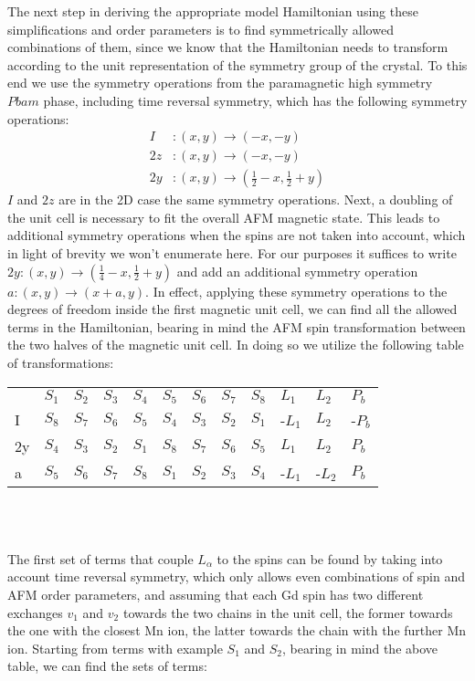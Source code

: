 The next step in deriving the appropriate model Hamiltonian using these simplifications and order parameters is to find symmetrically allowed combinations of them, since we know that the Hamiltonian needs to transform according to the unit representation of the symmetry group of the crystal.
To this end we use the symmetry operations from the paramagnetic high symmetry $Pbam$ phase, including time reversal symmetry, which has the following symmetry operations:
\begin{align}
	I &: (x, y) \rightarrow (-x, -y)\\
	2z &: (x, y) \rightarrow (-x, -y)\\
	2y &: (x, y) \rightarrow (\frac{1}{2} - x, \frac{1}{2} + y)
\end{align}
$I$ and $2z$ are in the 2D case the same symmetry operations. Next, a doubling of the unit cell is necessary to fit the overall AFM magnetic state. This leads to additional symmetry operations when the spins are not taken into account, which in light of brevity we won't enumerate here. For our purposes it suffices to write $2y: (x, y) \rightarrow (\frac{1}{4} - x, \frac{1}{2}+y)$ and add an additional symmetry operation $a: (x, y) \rightarrow (x + a, y)$.
In effect, applying these symmetry operations to the degrees of freedom inside the first magnetic unit cell, we can find all the allowed terms in the Hamiltonian, bearing in mind the AFM spin transformation between the two halves of the magnetic unit cell.
In doing so we utilize the following table of transformations:
\begin{table}[]
\begin{tabular}{|l|lllllllllll|}
\cline{1-12}
 & $S_1$ & $S_2$ & $S_3$ & $S_4$ & $S_5$ & $S_6$ & $S_7$ & $S_8$ & $L_1$ & $L_2$ & $P_b$ \\ \cline{1-12}
I & $S_8$ & $S_7$ & $S_6$ & $S_5$ & $S_4$ & $S_3$ & $S_2$ & $S_1$ & -$L_1$ & $L_2$ & -$P_b$ \\ \cline{1-12}
2y & $S_4$ & $S_3$ & $S_2$ & $S_1$ & $S_8$ & $S_7$ & $S_6$ & $S_5$ & $L_1$ & $L_2$ & $P_b$ \\ \cline{1-12}
a & $S_5$ & $S_6$ & $S_7$ & $S_8$ & $S_1$ & $S_2$ & $S_3$ & $S_4$ & -$L_1$ & -$L_2$ & $P_b$ \\ \cline{1-12}
\end{tabular}\\\\
\end{table}
The first set of terms that couple $L_\alpha$ to the spins can be found by taking into account time reversal symmetry, which only allows even combinations of spin and AFM order parameters, and assuming that each Gd spin has two different exchanges $v_1$ and $v_2$ towards the two chains in the unit cell, the former towards the one with the closest Mn ion, the latter towards the chain with the further Mn ion. Starting from terms with example $S_1$ and $S_2$, bearing in mind the above table, we can find the sets of terms:
